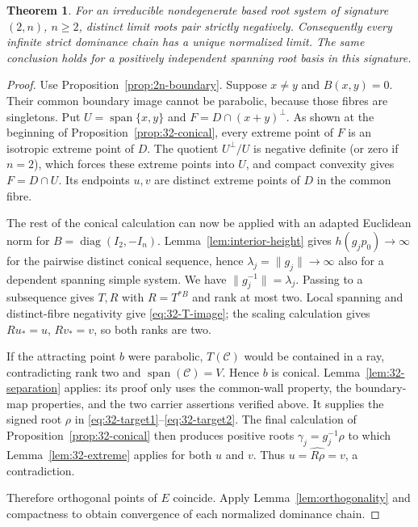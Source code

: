 \documentclass[11pt,reqno]{amsart}
\theoremstyle{plain}
\newtheorem{theorem}{Theorem}[section]
\theoremstyle{definition}
\theoremstyle{remark}
\numberwithin{equation}{section}
\begin{document}
\begin{theorem}\label{thm:positive-index-two}
For an irreducible nondegenerate based root system of signature $(2,n)$, $n\geq2$, distinct limit roots pair strictly negatively. Consequently every infinite strict dominance chain has a unique normalized limit. The same conclusion holds for a positively independent spanning root basis in this signature.
\end{theorem}
\begin{proof}
Use Proposition~\ref{prop:2n-boundary}. Suppose $x\ne y$ and $B(x,y)=0$. Their common boundary image cannot be parabolic, because those fibres are singletons. Put $U=\operatorname{span}\{x,y\}$ and $F=D\cap(x+y)^\perp$. As shown at the beginning of Proposition~\ref{prop:32-conical}, every extreme point of $F$ is an isotropic extreme point of $D$. The quotient $U^\perp/U$ is negative definite (or zero if $n=2$), which forces these extreme points into $U$, and compact convexity gives $F=D\cap U$. Its endpoints $u,v$ are distinct extreme points of $D$ in the common fibre.

The rest of the conical calculation can now be applied with an adapted Euclidean norm for $B=\operatorname{diag}(I_2,-I_n)$. Lemma~\ref{lem:interior-height} gives $h(g_jp_0)\to\infty$ for the pairwise distinct conical sequence, hence $\lambda_j=\|g_j\|\to\infty$ also for a dependent spanning simple system. We have $\|g_j^{-1}\|=\lambda_j$. Passing to a subsequence gives $T,R$ with $R=T^{*B}$ and rank at most two. Local spanning and distinct-fibre negativity give \eqref{eq:32-T-image}; the scaling calculation gives $Ru_*=u$, $Rv_*=v$, so both ranks are two.

If the attracting point $b$ were parabolic, $T(\mathcal C)$ would be contained in a ray, contradicting rank two and $\operatorname{span}(\mathcal C)=V$. Hence $b$ is conical. Lemma~\ref{lem:32-separation} applies: its proof only uses the common-wall property, the boundary-map properties, and the two carrier assertions verified above. It supplies the signed root $\rho$ in \eqref{eq:32-target1}--\eqref{eq:32-target2}. The final calculation of Proposition~\ref{prop:32-conical} then produces positive roots $\gamma_j=g_j^{-1}\rho$ to which Lemma~\ref{lem:32-extreme} applies for both $u$ and $v$. Thus $u=\widehat{R\rho}=v$, a contradiction.

Therefore orthogonal points of $E$ coincide. Apply Lemma~\ref{lem:orthogonality} and compactness to obtain convergence of each normalized dominance chain.
\end{proof}
\end{document}
